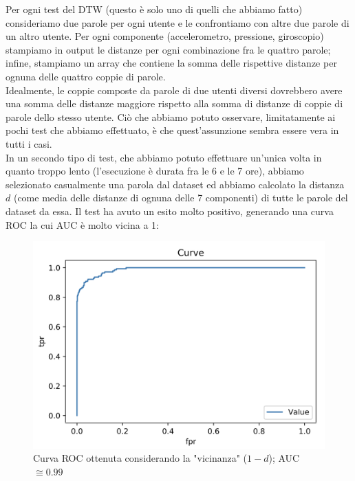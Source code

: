 \documentclass[8pt,notitlepage]{report}
\begin{document}
			Per ogni test del DTW (questo è solo uno di quelli che abbiamo fatto) consideriamo due parole per ogni utente e le confrontiamo con altre due parole di un altro utente. Per ogni componente (accelerometro, pressione, giroscopio) stampiamo in output le distanze per ogni combinazione fra le quattro parole; infine, stampiamo un array che contiene la somma delle rispettive distanze per ognuna delle quattro coppie di parole. \\
			Idealmente, le coppie composte da parole di due utenti diversi dovrebbero avere una somma delle distanze maggiore rispetto alla somma di distanze di coppie di parole dello stesso utente. Ciò che abbiamo potuto osservare, limitatamente ai pochi test che abbiamo effettuato, è che quest'assunzione sembra essere vera in tutti i casi. \\
			In un secondo tipo di test, che abbiamo potuto effettuare un'unica volta in quanto troppo lento (l'esecuzione è durata fra le 6 e le 7 ore),  abbiamo selezionato casualmente una parola dal dataset ed abbiamo calcolato la distanza $ d $ (come media delle distanze di ognuna delle 7 componenti) di tutte le parole del dataset da essa. Il test ha avuto un esito molto positivo, generando una curva ROC la cui AUC è molto vicina a 1:
			
			\begin{figure}[H]
				\begin{center}
					\includegraphics[scale=.4]{ROC_DTW}
					\caption{Curva ROC ottenuta considerando la "vicinanza" ($ 1 - d $); AUC $ \cong 0.99 $}
				\end{center}
			\end{figure}
			
\end{document}
